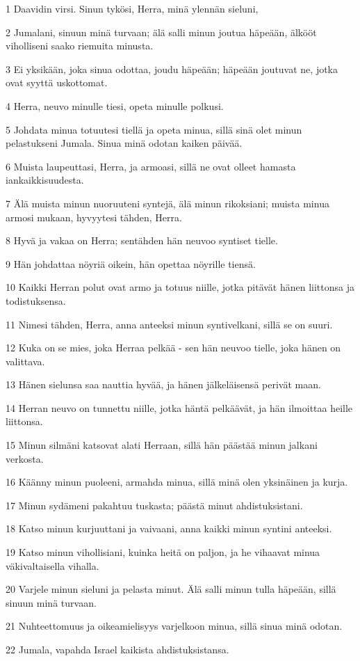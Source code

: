 \par 1 Daavidin virsi. Sinun tykösi, Herra, minä ylennän sieluni,
\par 2 Jumalani, sinuun minä turvaan; älä salli minun joutua häpeään, älkööt viholliseni saako riemuita minusta.
\par 3 Ei yksikään, joka sinua odottaa, joudu häpeään; häpeään joutuvat ne, jotka ovat syyttä uskottomat.
\par 4 Herra, neuvo minulle tiesi, opeta minulle polkusi.
\par 5 Johdata minua totuutesi tiellä ja opeta minua, sillä sinä olet minun pelastukseni Jumala. Sinua minä odotan kaiken päivää.
\par 6 Muista laupeuttasi, Herra, ja armoasi, sillä ne ovat olleet hamasta iankaikkisuudesta.
\par 7 Älä muista minun nuoruuteni syntejä, älä minun rikoksiani; muista minua armosi mukaan, hyvyytesi tähden, Herra.
\par 8 Hyvä ja vakaa on Herra; sentähden hän neuvoo syntiset tielle.
\par 9 Hän johdattaa nöyriä oikein, hän opettaa nöyrille tiensä.
\par 10 Kaikki Herran polut ovat armo ja totuus niille, jotka pitävät hänen liittonsa ja todistuksensa.
\par 11 Nimesi tähden, Herra, anna anteeksi minun syntivelkani, sillä se on suuri.
\par 12 Kuka on se mies, joka Herraa pelkää - sen hän neuvoo tielle, joka hänen on valittava.
\par 13 Hänen sielunsa saa nauttia hyvää, ja hänen jälkeläisensä perivät maan.
\par 14 Herran neuvo on tunnettu niille, jotka häntä pelkäävät, ja hän ilmoittaa heille liittonsa.
\par 15 Minun silmäni katsovat alati Herraan, sillä hän päästää minun jalkani verkosta.
\par 16 Käänny minun puoleeni, armahda minua, sillä minä olen yksinäinen ja kurja.
\par 17 Minun sydämeni pakahtuu tuskasta; päästä minut ahdistuksistani.
\par 18 Katso minun kurjuuttani ja vaivaani, anna kaikki minun syntini anteeksi.
\par 19 Katso minun vihollisiani, kuinka heitä on paljon, ja he vihaavat minua väkivaltaisella vihalla.
\par 20 Varjele minun sieluni ja pelasta minut. Älä salli minun tulla häpeään, sillä sinuun minä turvaan.
\par 21 Nuhteettomuus ja oikeamielisyys varjelkoon minua, sillä sinua minä odotan.
\par 22 Jumala, vapahda Israel kaikista ahdistuksistansa.

